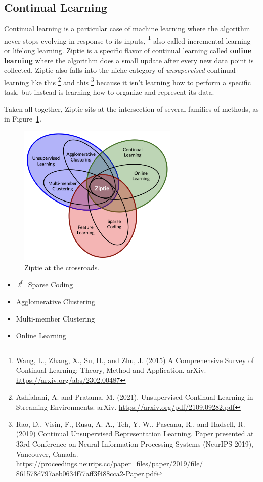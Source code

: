 \subsection{Continual Learning}
\label{subsec:continual}

Continual learning is a particular case of machine learning where the
algorithm never stops evolving in response to its inputs,
\footnote{Wang, L., Zhang, X., Su, H., and Zhu, J. (2015)
A Comprehensive Survey of Continual Learning: Theory, Method and Application.
arXiv.
\href{https://arxiv.org/abs/2302.00487}{https://arxiv.org/abs/2302.00487}
}
also called incremental learning or lifelong learning.
Ziptie is a specific flavor of continual learning called
\textbf{\href{https://en.wikipedia.org/wiki/Online_machine_learning}{online learning}}
where the algorithm does a small update after every new data point is collected.
Ziptie also falls into the niche category of \textit{unsupervised}
continual learning like this
\footnote{Ashfahani, A. and Pratama, M. (2021).
Unsupervised Continual Learning in Streaming Environments. arXiv.
\href{https://arxiv.org/pdf/2109.09282.pdf}{https://arxiv.org/pdf/2109.09282.pdf}
}
and this
\footnote{Rao, D., Visin, F., Rusu, A. A., Teh, Y. W., Pascanu, R., and Hadsell, R.
(2019) Continual Unsupervised Representation Learning.
Paper presented at 33rd Conference on Neural Information Processing Systems
(NeurIPS 2019), Vancouver, Canada.
\href{https://proceedings.neurips.cc/paper_files/paper/2019/file/861578d797aeb0634f77aff3f488cca2-Paper.pdf}
{https://proceedings.neurips.cc/paper\_files/paper/2019/file/ 861578d797aeb0634f77aff3f488cca2-Paper.pdf}
}
because it isn't learning how to perform a specific task, but instead is
learning how to organize and represent its data. 


Taken all together, Ziptie sits at the intersection 
of several families of methods, as in Figure~\ref{fig:venn}.

\begin{figure}[ht]
\vskip 0.2in
\begin{center}
\centerline{\includegraphics[width=3.0in]{images/ziptie_venn.png}}
\caption{Ziptie at the crossroads.}
\label{fig:venn}
\end{center}
\vskip -0.2in
\end{figure}

\begin{itemize}
\item{$\ell^0$ Sparse Coding}
\item{Agglomerative Clustering}
\item{Multi-member Clustering}
\item{Online Learning}
\end{itemize}
